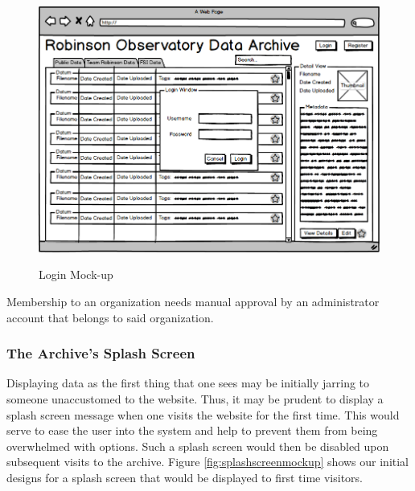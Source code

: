 \documentclass[12pt]{report}
\begin{document}
\begin{figure}[h]
	\centering
	\caption{Login Mock-up}
	\includegraphics[width=\linewidth]{login}
	\label{fig:loginmockup}
\end{figure}

Membership to an organization needs manual approval by an administrator account that belongs to said organization.


\subsubsection*{The Archive's Splash Screen}

Displaying data as the first thing that one sees may be initially jarring to someone unaccustomed to the website. Thus, it may be prudent to display a splash screen message when one visits the website for the first time. This would serve to ease the user into the system and help to prevent them from being overwhelmed with options. Such a splash screen would then be disabled upon subsequent visits to the archive. Figure \ref{fig:splashscreenmockup} shows our initial designs for a splash screen that would be displayed to first time visitors.
\end{document}
